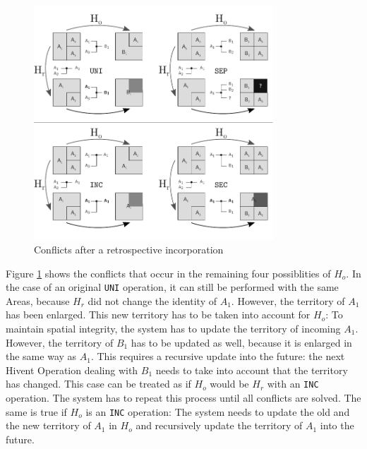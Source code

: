 \begin{figure}[ht]
\vspace{1em}
  \centering
  \includegraphics[width=0.8\textwidth]{graphics/development/editing_hivent_data/retrospective_updates/INC}
  \caption{Conflicts after a retrospective incorporation}
  \label{fig:update_conflict_INC}
\end{figure}

Figure \ref{fig:update_conflict_INC} shows the conflicts that occur in the remaining four possiblities of $H_o$. In the case of an original \texttt{UNI} operation, it can still be performed with the same Areas, because $H_r$ did not change the identity of $A_1$. However, the territory of $A_1$ has been enlarged. This new territory has to be taken into account for $H_o$: To maintain spatial integrity, the system has to update the territory of incoming $A_1$. However, the territory of $B_1$ has to be updated as well, because it is enlarged in the same way as $A_1$. This requires a recursive update into the future: the next Hivent Operation dealing with $B_1$ needs to take into account that the territory has changed. This case can be treated as if $H_o$ would be $H_r$ with an \texttt{INC} operation. The system has to repeat this process until all conflicts are solved. The same is true if $H_o$ is an \texttt{INC} operation: The system needs to update the old and the new territory of $A_1$ in $H_o$ and recursively update the territory of $A_1$ into the future.

